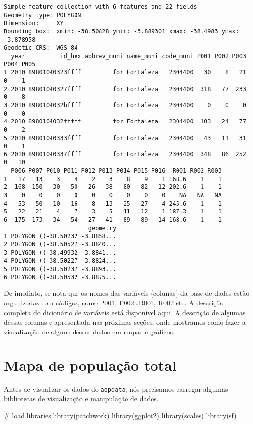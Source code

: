 \documentclass[
  letterpaper,
  DIV=11,
  numbers=noendperiod]{scrreprt}
\newenvironment{Shaded}{\begin{snugshade}}{\end{snugshade}}
\newcommand{\CommentTok}[1]{\textcolor[rgb]{0.37,0.37,0.37}{#1}}
\newcommand{\FunctionTok}[1]{\textcolor[rgb]{0.28,0.35,0.67}{#1}}
\newcommand{\NormalTok}[1]{\textcolor[rgb]{0.00,0.23,0.31}{#1}}
\begin{document}
\begin{verbatim}
Simple feature collection with 6 features and 22 fields
Geometry type: POLYGON
Dimension:     XY
Bounding box:  xmin: -38.50828 ymin: -3.889301 xmax: -38.4983 ymax: -3.878958
Geodetic CRS:  WGS 84
  year          id_hex abbrev_muni name_muni code_muni P001 P002 P003 P004 P005
1 2010 89801040323ffff         for Fortaleza   2304400   30    8   21    0    1
2 2010 89801040327ffff         for Fortaleza   2304400  318   77  233    0    8
3 2010 8980104032bffff         for Fortaleza   2304400    0    0    0    0    0
4 2010 8980104032fffff         for Fortaleza   2304400  103   24   77    0    2
5 2010 89801040333ffff         for Fortaleza   2304400   43   11   31    0    1
6 2010 89801040337ffff         for Fortaleza   2304400  348   86  252    0   10
  P006 P007 P010 P011 P012 P013 P014 P015 P016  R001 R002 R003
1   17   13    3    4    2    3    8    9    1 168.6    1    1
2  168  150   30   50   26   38   80   82   12 202.6    1    1
3    0    0    0    0    0    0    0    0    0    NA   NA   NA
4   53   50   10   16    8   13   25   27    4 245.6    1    1
5   22   21    4    7    3    5   11   12    1 187.3    1    1
6  175  173   34   54   27   41   89   89   14 168.6    1    1
                        geometry
1 POLYGON ((-38.50232 -3.8858...
2 POLYGON ((-38.50527 -3.8840...
3 POLYGON ((-38.49932 -3.8841...
4 POLYGON ((-38.50227 -3.8824...
5 POLYGON ((-38.50237 -3.8893...
6 POLYGON ((-38.50532 -3.8875...
\end{verbatim}

De imediato, se nota que os nomes das variáveis (colunas) da base de
dados estão organizadas com códigos, como P001, P002\ldots R001, R002
etc. A
\href{https://ipeagit.github.io/aopdata/articles/data_dic_pt.html}{descrição
completa do dicionário de variáveis está disponível aqui}. A descrição
de algumas dessas colunas é apresentada nas próximas seções, onde
mostramos como fazer a visualização de alguns desses dados em mapas e
gráficos.

\hypertarget{mapa-de-populauxe7uxe3o-total}{%
\section{Mapa de população total}\label{mapa-de-populauxe7uxe3o-total}}

Antes de visualizar os dados do \texttt{aopdata}, nós precisamos
carregar algumas bibliotecas de visualização e manipulação de dados.

\begin{Shaded}
\begin{Highlighting}[]
\CommentTok{\# load libraries}
\FunctionTok{library}\NormalTok{(patchwork)}
\FunctionTok{library}\NormalTok{(ggplot2)}
\FunctionTok{library}\NormalTok{(scales)}
\FunctionTok{library}\NormalTok{(sf)}
\end{Highlighting}
\end{Shaded}
\end{document}
